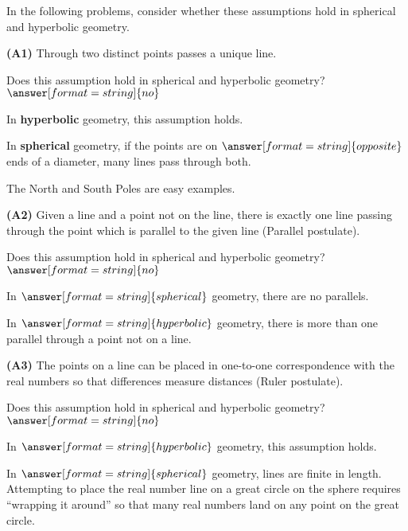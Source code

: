 \documentclass[nooutcomes]{ximera}
\begin{document}
In the following problems, consider whether these assumptions hold in spherical and hyperbolic geometry. 



\begin{problem}
\textbf{(A1)} Through two distinct points passes a unique line.

Does this assumption hold in spherical and hyperbolic geometry? 
$\answer[format=string]{no}$

\begin{problem}
In \textbf{hyperbolic} geometry, this assumption holds. 

In \textbf{spherical} geometry, if the points are on $\answer[format=string]{opposite}$ ends of a diameter, many lines pass through both.
\begin{feedback}
The North and South Poles are easy examples.  
\end{feedback}
\end{problem}
\end{problem}

\begin{problem}
\textbf{(A2)} Given a line and a point not on the line, there is exactly one line passing through the point which is parallel to the given line (Parallel postulate).

Does this assumption hold in spherical and hyperbolic geometry? 
$\answer[format=string]{no}$
\begin{problem}
In $\answer[format=string]{spherical}$ geometry, there are no parallels. 

In $\answer[format=string]{hyperbolic}$ geometry, there is more than one parallel through a point not on a line. 
\end{problem}
\end{problem}

\begin{problem}
\textbf{(A3)} The points on a line can be placed in one-to-one correspondence with the real numbers so that differences measure distances (Ruler postulate).  

Does this assumption hold in spherical and hyperbolic geometry? 
$\answer[format=string]{no}$

\begin{problem}
In $\answer[format=string]{hyperbolic}$ geometry, this assumption holds. 

In $\answer[format=string]{spherical}$ geometry, lines are finite in length.  Attempting to place the real number line on a great circle on the sphere requires ``wrapping it around'' so that many real numbers land on any point on the great circle.  
\end{problem}
\end{problem}
\end{document}
